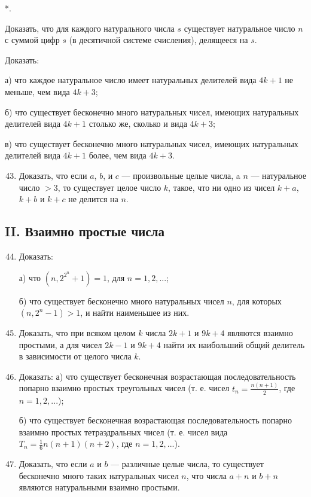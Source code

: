 \documentclass[12pt, a4paper, openany]{book}
\newcounter{namedlistcounter}  %
\newenvironment{withdot}
{\begin{list}
		{\arabic{namedlistcounter}*.} %
		{\usecounter{namedlistcounter}   %
			\setlength{\leftmargin}{3em}} %
	}
	{\end{list}}
\begin{document}
\begin{withdot}
	\addtocounter{namedlistcounter}{40}
	\item Доказать, что для каждого натурального числа $s$ существует натуральное число $n$ с суммой цифр $s$ (в десятичной системе счисления), делящееся на $s$.
	\item Доказать:

	а)	что каждое натуральное число имеет натуральных делителей вида $4k+1$ не меньше, чем вида $4k+3$;

	б)	что существует бесконечно много натуральных чисел, имеющих натуральных делителей вида $4k+1$ столько же, сколько и вида $4k+3$;

	в)	что существует бесконечно много натуральных чисел, имеющих натуральных делителей вида $4k+1$ более, чем вида $4k+3$.
	
\end{withdot}

\begin{enumerate}
	\setcounter{enumi}{42}
	\item Доказать, что если $a$, $b$, и $c$ — произвольные целые числа, a $n$ — натуральное число $>3$, то существует целое число $k$, такое, что ни одно из чисел $k+a$, $k + b$ и $k + c$ не делится на $n$.
	
\end{enumerate}

\subsection[II. Взаимно простые числа]{\center II. Взаимно простые числа}

\begin{enumerate}
	\setcounter{enumi}{43}
	\item Доказать:

	а)	что $(n, 2^{2^n}+1)=1$, для $n=1, 2, ...$;

	б)	что существует бесконечно много натуральных чисел $n$, для которых $(n, 2^n-1)>1$, и найти наименьшее из них.
	
	\item Доказать, что при всяком целом $k$ числа $2k+1$ и $9k+4$ являются взаимно простыми, а для чисел $2k-1$ и $9k+4$ найти их наибольший общий делитель в зависимости от целого числа $k$.
	
	\item Доказать: а) что существует бесконечная возрастающая последовательность попарно взаимно простых треугольных чисел (т. е. чисел $t_n=\frac{n(n+1)}{2}$, где $n=1, 2, ...$);

	б) что существует бесконечная возрастающая последовательность попарно взаимно простых тетраэдральных чисел (т. е. чисел вида $T_n=\frac{1}{6}n(n+1)(n+2)$, где $n=1, 2, ...$).
	
	\item Доказать, что если $a$ и $b$ — различные целые числа, то существует бесконечно много таких натуральных чисел $n$, что числа $a + n$ и $b + n$ являются натуральными взаимно простыми.
	
\end{enumerate}
\end{document}
